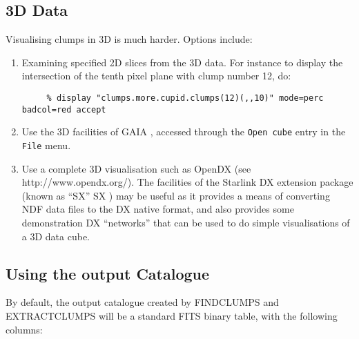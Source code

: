 \documentclass[twoside,11pt]{article}
\newcommand{\htmladdnormallink}[2]{#1}
\newcommand{\xref}[3]{#1}
\renewcommand{\_}{\texttt{\symbol{95}}}
\begin{document}
\subsection{3D Data}

Visualising clumps in 3D is much harder. Options include:

\begin{enumerate}

\item Examining specified 2D slices from the 3D data. For instance to
display the intersection of the tenth pixel plane with clump number 12, do:

\small
\begin{verbatim}
     % display "clumps.more.cupid.clumps(12)(,,10)" mode=perc badcol=red accept
\end{verbatim}
\normalsize

\item Use the 3D facilities of \xref{GAIA}{sun214}{} ,
accessed through the \verb+Open cube+ entry in the \verb+File+ menu.

\item Use a complete 3D visualisation such as OpenDX (see 
\htmladdnormallink{http://www.opendx.org/}{http://www.opendx.org/}). The
facilities of the Starlink DX extension package (known as ``SX'' 
\xref{SX}{sun203}{} ) may be useful as it provides
a means of converting NDF data files to the DX native format, and also
provides some demonstration DX ``networks'' that can be used to do simple
visualisations of a 3D data cube.



\end{enumerate}


\subsection{Using the output Catalogue}
By default, the output catalogue created by FINDCLUMPS and EXTRACTCLUMPS
will be a standard FITS binary table, with the following columns:
\end{document}
